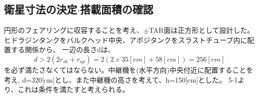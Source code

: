 \documentclass[15pt,uplatex,dvipdfmx]{jsarticle}
\begin{document}
\subsection{衛星寸法の決定$\cdot$搭載面積の確認}
円形のフェアリングに収容することを考え、$\pm$TAR面は正方形として設計した。
ヒドラジンタンクをバルクヘッド中央、アポジタンクをスラストチューブ内に配置する関係から、
一辺の長さdは、
\begin{equation}
  d > 2(2r_{sk} + r_{ap}) = 2(2 \times 35[cm] + 58[cm]) = 256[cm]
\end{equation}
を必ず満たさなくてはならない。中継機を(水平方向)中央付近に配置することを考え,
d=320[cm]とし、また中継機の高さを考えて、h=150[cm]とした。
5-1より、これは条件を満たすと考えられる。
\end{document}

